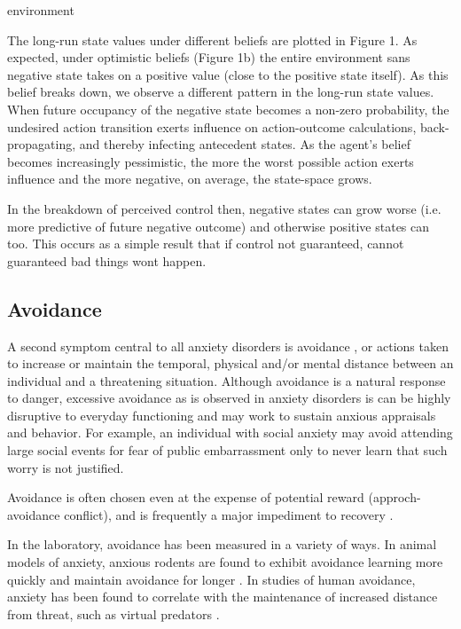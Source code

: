 environment\documentclass[11pt]{article} %
\begin{document}
The long-run state values under different beliefs are plotted in Figure 1. As
expected, under optimistic beliefs (Figure 1b) the entire environment sans negative
state takes on a positive value (close to the positive state itself). As this belief
breaks down, we observe a different pattern in the long-run state values. When
future occupancy of the negative state becomes a non-zero probability, the undesired
action transition exerts influence on action-outcome calculations, back-propagating,
and thereby infecting antecedent states. As the agent's belief becomes increasingly
pessimistic, the more the worst possible action exerts influence and the more
negative, on average, the state-space grows.

In the breakdown of perceived control then, negative states can grow worse (i.e.
more predictive of future negative outcome) and otherwise positive states can too.
This occurs as a simple result that if control not guaranteed, cannot guaranteed
bad things wont happen.


\subsection{Avoidance}

A second symptom central to all anxiety disorders is avoidance \citep{dsm5,
Krypotos2015, Arnaudova2017}, or actions taken to increase or maintain the temporal,
physical and/or mental distance between an individual and a threatening situation.
Although avoidance is a natural response to danger, excessive avoidance as is
observed in anxiety disorders is can be highly disruptive to everyday functioning
\cite{Salter2004} and may work to sustain anxious appraisals and behavior. For
example, an individual with social anxiety may avoid attending large social events
for fear of public embarrassment only to never learn that such worry is not justified.

Avoidance is often chosen even at the expense of potential reward (approch-avoidance
conflict), and is frequently a major impediment to recovery \citep{Arnaudova2017}.

In the laboratory, avoidance has been measured in a variety of ways. In animal
models of anxiety, anxious rodents are found to exhibit avoidance learning more
quickly and maintain avoidance for longer \citep{servatius2008}. In studies of
human avoidance, anxiety has been found to correlate with the maintenance of
increased distance from threat, such as virtual predators \citep{Bach2014, Bach2017,
Sheynin2014}.
\end{document}
